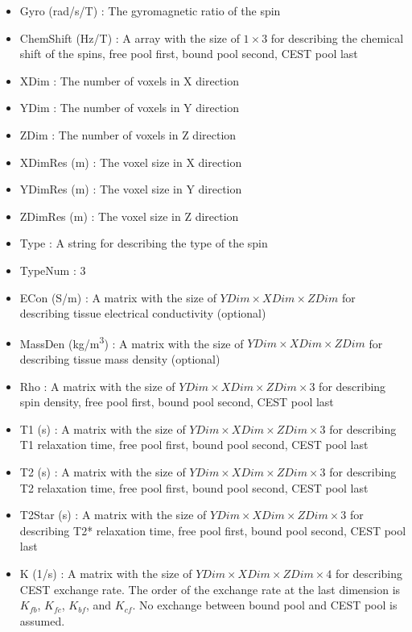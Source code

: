\documentclass{book}%
\begin{document}
\begin{enumerate}
\begin{itemize}
	\item Gyro (rad/s/T) : The gyromagnetic ratio of the spin
	\item ChemShift (Hz/T) : A array with the size of $1 \times 3 $ for describing the chemical shift of the spins, free pool first, bound pool second, CEST pool last
	\item XDim : The number of voxels in X direction
	\item YDim : The number of voxels in Y direction
	\item ZDim : The number of voxels in Z direction
	\item XDimRes (m) : The voxel size in X direction
	\item YDimRes (m) : The voxel size in Y direction
	\item ZDimRes (m) : The voxel size in Z direction
	\item Type : A string for describing the type of the spin
	\item TypeNum : 3
	\item ECon (S/m) : A matrix with the size of $ YDim \times XDim \times ZDim $ for describing tissue electrical conductivity (optional)
	\item MassDen (kg/m\textsuperscript{3}) : A matrix with the size of $ YDim \times XDim \times ZDim $ for describing tissue mass density (optional)
	\item Rho : A matrix with the size of $ YDim \times XDim \times ZDim \times 3 $ for describing spin density, free pool first, bound pool second, CEST pool last
	\item T1 (s) : A matrix with the size of $ YDim \times XDim \times ZDim \times 3 $ for describing T1 relaxation time, free pool first, bound pool second, CEST pool last
	\item T2 (s) : A matrix with the size of $ YDim \times XDim \times ZDim \times 3 $ for describing T2 relaxation time, free pool first, bound pool second, CEST pool last
	\item T2Star (s) : A matrix with the size of $ YDim \times XDim \times ZDim \times 3 $ for describing T2* relaxation time, free pool first, bound pool second, CEST pool last
	\item K (1/s) : A matrix with the size of $ YDim \times XDim \times ZDim \times 4 $ for describing CEST exchange rate. The order of the exchange rate at the last dimension is $K_{fb}$, $K_{fc}$, $K_{bf}$, and $K_{cf}$. No exchange between bound pool and CEST pool is assumed.
\end{itemize}


\end{enumerate}
\end{document}
